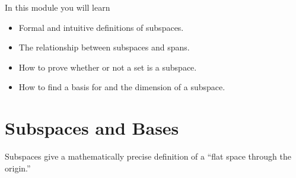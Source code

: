 \documentclass{problemset}
\newcommand{\bookonlynewpage}{\begin{bookonly}\newpage\end{bookonly}}
\begin{document}
\begin{module}

	In this module you will learn
	\begin{itemize}
		\item Formal and intuitive definitions of subspaces.
		\item The relationship between subspaces and spans.
		\item How to prove whether or not a set is a subspace.
		\item How to find a basis for and the dimension of a subspace.
	\end{itemize}

	
\end{module}
	\bookonlynewpage
\section*{Subspaces and Bases}
	\vspace{-1em}

	Subspaces give a mathematically precise definition of a ``flat space through the origin.''
\end{document}
